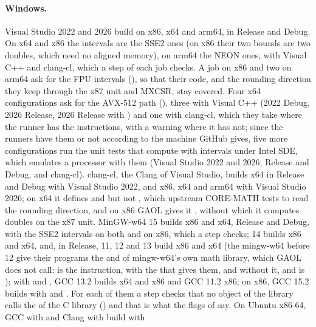 \paragraph{Windows.} Visual Studio 2022 and 2026 build on x86, x64 and
arm64, in Release and Debug. On x64 and x86 the intervals are the SSE2 ones
(on x86 their two bounds are two doubles, which need no aligned memory), on
arm64 the NEON ones, with Visual C++ and clang-cl, which a step of each job
checks.\newinvfive{} A job on x86 and two on arm64 ask for the FPU intervals
(), so that their code, and the rounding direction
they keep through the x87 unit and MXCSR, stay covered. Four x64 configurations
ask for the AVX-512 path (), three with Visual C++
(2022 Debug, 2026 Release, 2026 Release with ) and one with
clang-cl, which they take where the
runner has the instructions, with a warning where it has not; since the
runners have them or not according to the machine GitHub gives, five more
configurations run the unit tests that compute with intervals under Intel SDE, which
emulates a processor with them
(Visual Studio 2022 and 2026, Release and Debug, and clang-cl). clang-cl,
the Clang of Visual Studio, builds x64 in Release and Debug with Visual
Studio 2022, and x86, x64 and arm64 with Visual Studio 2026; on x64 it
defines  and  but not ,
which upstream CORE-MATH tests to read the rounding direction, and on x86
GAOL gives it , without which it computes doubles on the x87
unit. MinGW-w64 15 builds x86 and x64, Release and Debug, with the SSE2
intervals on both and  on x86, which a step checks;
14 builds x86 and x64, and, in Release, 11, 12 and 13 build x86 and x64
(the mingw-w64 before 12 give their programs the  and 
of mingw-w64's own math library, which GAOL does not call:  is the
instruction, with the  that  gives them, and
 without it, and  is ); with
 and , GCC 13.2 builds x64 and x86 and GCC
11.2 x86; on x86, GCC 15.2 builds with  and
. For each of them a step checks that no object of the library
calls the  of the C library
() and that  is
what the flags of  say. On Ubuntu x86-64, GCC with 
and Clang with  build with
